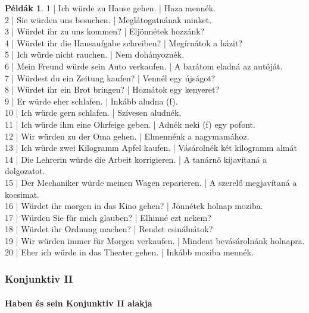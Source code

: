 \documentclass{article}
\theoremstyle{definition}
\newtheorem*{exmp}{Példák}
\begin{document}
\begin{exmp}
1 | Ich würde zu Hause gehen. | Haza mennék.\\
2 | Sie würden uns besuchen. | Meglátogatnának minket.\\
3 | Würdet ihr zu uns kommen? | Eljönnétek hozzánk?\\
4 | Würdet ihr die Hausaufgabe schreiben? | Megírnátok a házit?\\
5 | Ich würde nicht rauchen. | Nem dohányoznék.\\
6 | Mein Freund würde sein Auto verkaufen. | A barátom eladná az autóját.\\
7 | Würdest du ein Zeitung kaufen? | Vennél egy újságot?\\
8 | Würdet ihr ein Brot bringen? | Hoznátok egy kenyeret?\\
9 | Er würde eher schlafen. | Inkább aludna (f).\\
10 | Ich würde gern schlafen. | Szívesen aludnék.\\
11 | Ich würde ihm eine Ohrfeige geben. | Adnék neki (f) egy pofont.\\
12 | Wir würden zu der Oma gehen. | Elmennénk a nagymamához.\\
13 | Ich würde zwei Kilogramm Apfel kaufen. | Vásárolnék két kilogramm almát\\
14 | Die Lehrerin würde die Arbeit korrigieren. | A tanárnő kijavítaná a dolgozatot.\\
15 | Der Mechaniker würde meinen Wagen reparieren. | A szerelő megjavítaná a kocsimat.\\
16 | Würdet ihr morgen in das Kino gehen? | Jönnétek holnap moziba.\\
17 | Würden Sie für mich glauben? | Elhinné ezt nekem?\\
18 | Würdet ihr Ordnung machen? | Rendet csinálnátok?\\
19 | Wir würden immer für Morgen verkaufen. | Mindent bevásárolnánk holnapra.\\
20 | Eher ich würde in das Theater gehen. | Inkább moziba mennék.\\
\end{exmp}

\subsubsection{Konjunktiv II}

\paragraph{Haben és sein Konjunktiv II alakja}
\end{document}
